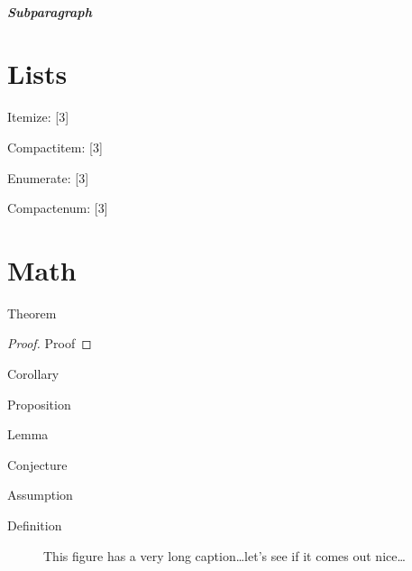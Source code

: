 \documentclass[english,counters by chapter]{uniud}
\begin{document}
\blindtext

\subparagraph{Subparagraph}

\blindtext

\section{Lists}

\blindtext[1]
Itemize:
[3]

\blindtext[1]
Compactitem:
[3]

\blindtext[1]
Enumerate:
[3]

\blindtext[1]
Compactenum:
[3]
\blindtext[1]

\section{Math}

\begin{theorem}
	\label{thm:first}
	Theorem
\end{theorem}
\begin{proof}
	Proof
\end{proof}

\begin{corollary}
	\label{cor:first}
	Corollary
\end{corollary}

\begin{proposition}
	\label{prop:first}
	Proposition
\end{proposition}

\begin{lemma}
	\label{lem:first}
	Lemma
\end{lemma}

\begin{conjecture}
	\label{conj:first}
	Conjecture
\end{conjecture}

\begin{assumption}
	\label{asmp:first}
	Assumption
\end{assumption}

\begin{definition}
	\label{def:first}
	Definition
\end{definition}

\begin{remark}
	\label{rem:first}
	\blindtext[1]
\end{remark}

\begin{figure}[t]
	\begin{center}
	\end{center}
	\caption{This figure has a very long caption\dots let's see if it comes out nice\dots}
	\label{fig:first}
\end{figure}
\end{document}
